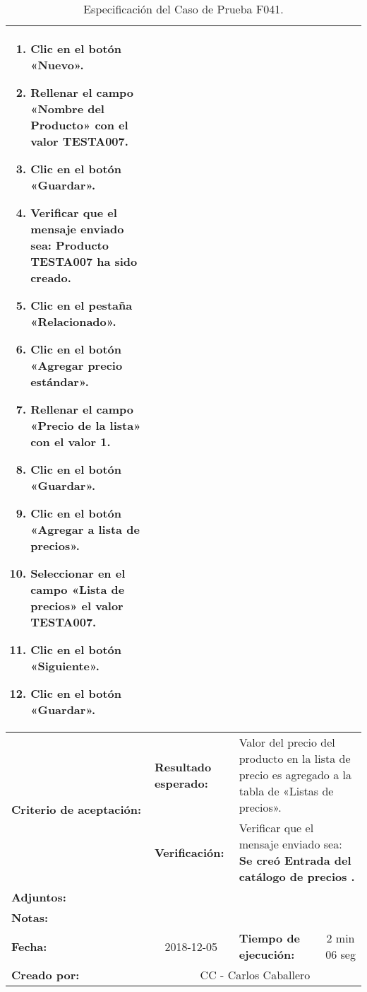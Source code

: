 \begin{table}[H]
\begin{tabular}{|p{2.5cm}|p{2.8cm}|p{2.2cm}|p{2.8cm}|p{2.2cm}|}
{{\begin{enumerate}
\item Clic en el botón «Nuevo».
\item Rellenar el campo «Nombre del Producto» con el valor \textbf{TESTA007}.
\item Clic en el botón «Guardar».
\item Verificar que el mensaje enviado sea:
    \textbf{Producto TESTA007 ha sido creado}.
\item Clic en el pestaña «Relacionado».
\item Clic en el botón «Agregar precio estándar».
\item Rellenar el campo «Precio de la lista» con el valor \textbf{1}.
\item Clic en el botón «Guardar».
\item Clic en el botón «Agregar a lista de precios».
\item Seleccionar en el campo «Lista de precios» el valor \textbf{TESTA007}.
\item Clic en el botón «Siguiente».
\item Clic en el botón «Guardar».
\end{enumerate}
}} \\
\hline
\multirow{2}{2.8cm}{\footnotesize{\textbf{Criterio de aceptación:}}} &
\footnotesize{\textbf{Resultado esperado:}} &
\multicolumn{3}{p{9.1cm}|}{\footnotesize{Valor del precio del producto en la
lista de precio es agregado a la tabla de «Listas de precios».}} \\
\cline{2-5}
& \footnotesize{\textbf{Verificación:}} &
\multicolumn{3}{p{9.1cm}|}{\footnotesize{Verificar que el mensaje enviado sea:
\textbf{Se creó Entrada del catálogo de precios .}}} \\
\hline
\footnotesize{\textbf{Adjuntos:}} &
\multicolumn{4}{p{12.4cm}|}{\footnotesize{}} \\
\hline
\footnotesize{\textbf{Notas:}} &
\multicolumn{4}{p{12.4cm}|}{\footnotesize{}} \\
\hline
\footnotesize{\textbf{Fecha:}} &
\multicolumn{1}{c|}{\footnotesize{2018-12-05}} &
\multicolumn{2}{l|}{\footnotesize{\textbf{Tiempo de ejecución:}}} &
\multicolumn{1}{c|}{\footnotesize{2 min 06 seg}} \\
\hline
\footnotesize{\textbf{Creado por:}} &
\multicolumn{4}{c|}{\footnotesize{CC - Carlos Caballero}} \\
\hline
\end{tabular}
\caption{Especificación del Caso de Prueba F041.}
\label{tcf041}
\end{table}

